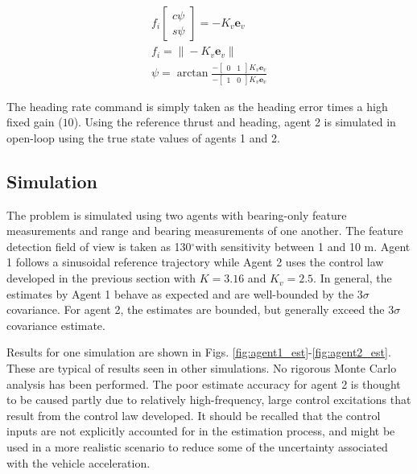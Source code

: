 \documentclass{aiaa-tc}
\newcommand{\degree}{\ensuremath{^\circ}}
\newcommand{\B}[1]{\textbf{#1}} %
\begin{document}
\begin{align}
f_i\begin{bmatrix}
c\psi \\
s\psi
\end{bmatrix} = -K_v \B{e}_v \\
f_i = \| -K_v \B{e}_v \| \\
\psi = \arctan{ \frac{-\begin{bmatrix}
0 & 1
\end{bmatrix} K_v\B{e}_v}{-\begin{bmatrix}
1 & 0
\end{bmatrix} K_v\B{e}_v }}
\end{align}

The heading rate command is simply taken as the heading error times a high fixed gain ($10$). Using the reference thrust and heading, agent 2 is simulated in open-loop using the true state values of agents 1 and 2.

\subsection{Simulation}

The problem is simulated using two agents with bearing-only feature measurements and range and bearing measurements of one another. The feature detection field of view is taken as 130\degree with sensitivity between 1 and 10 m. Agent 1 follows a sinusoidal reference trajectory while Agent 2 uses the control law developed in the previous section with $K = 3.16$ and $K_v = 2.5$. In general, the estimates by Agent 1 behave as expected and are well-bounded by the 3$\sigma$ covariance. For agent 2, the estimates are bounded, but generally exceed the 3$\sigma$ covariance estimate.

Results for one simulation are shown in Figs. \ref{fig:agent1_est}-\ref{fig:agent2_est}. These are typical of results seen in other simulations. No rigorous Monte Carlo analysis has been performed. The poor estimate accuracy for agent 2 is thought to be caused partly due to relatively high-frequency, large control excitations that result from the control law developed. It should be recalled that the control inputs are not explicitly accounted for in the estimation process, and might be used in a more realistic scenario to reduce some of the uncertainty associated with the vehicle acceleration.
\end{document}
